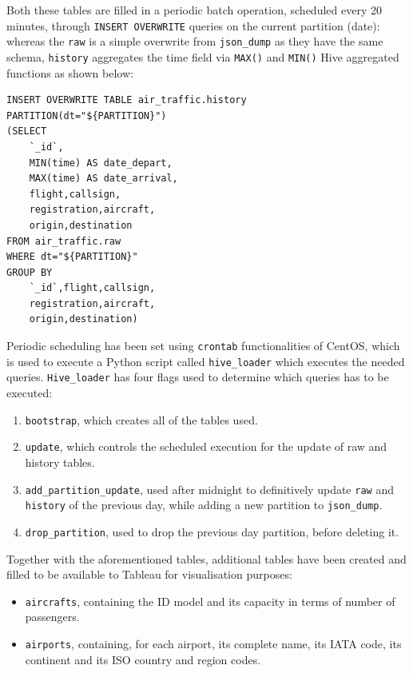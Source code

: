 Both these tables are filled in a periodic batch operation, scheduled every 20 minutes, through \texttt{INSERT OVERWRITE} queries on the current partition (date): whereas the \texttt{raw} is a simple overwrite from \texttt{json\_dump} as they have the same schema,  \texttt{history} aggregates the time field via \texttt{MAX()} and \texttt{MIN()} Hive aggregated functions as shown below:
\\
\begin{verbatim}
INSERT OVERWRITE TABLE air_traffic.history PARTITION(dt="${PARTITION}")
(SELECT
    `_id`,
    MIN(time) AS date_depart,
    MAX(time) AS date_arrival,
    flight,callsign,
    registration,aircraft,
    origin,destination
FROM air_traffic.raw
WHERE dt="${PARTITION}"
GROUP BY 
    `_id`,flight,callsign,
    registration,aircraft,
    origin,destination)
\end{verbatim}

Periodic scheduling has been set using \texttt{crontab} functionalities of CentOS, which is used to execute a Python script called \texttt{hive\_loader} which executes the needed queries. \texttt{Hive\_loader} has four flags used to determine which queries has to be executed:
\begin{enumerate}
    \item \texttt{bootstrap}, which creates all of the tables used.
    \item \texttt{update}, which controls the scheduled execution for the update of raw and history tables.
    \item \texttt{add\_partition\_update}, used after midnight to definitively update \texttt{raw} and \texttt{history} of the previous day, while adding a new partition to \texttt{json\_dump}.
    \item \texttt{drop\_partition}, used to drop the previous day partition, before deleting it.
\end{enumerate}

Together with the aforementioned tables, additional tables have been created and filled to be available to Tableau for visualisation purposes:

\begin{itemize}
    \item \texttt{aircrafts}, containing the ID model and its capacity in terms of number of passengers.
    \item \texttt{airports}, containing, for each airport, its complete name, its IATA code, its continent and its ISO country and region codes.
\end{itemize}
\pagebreak